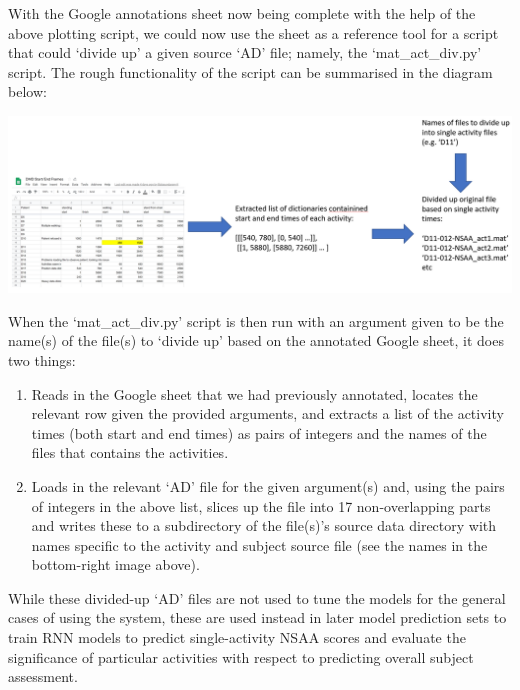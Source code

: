 \documentclass[12pt,twoside]{report}
\begin{document}
\quad With the Google annotations sheet now being complete with the help of the above plotting script, we could now use the sheet as a reference tool for a script that could ‘divide up’ a given source ‘AD’ file; namely, the ‘mat\_act\_div.py’ script. The rough functionality of the script can be summarised in the diagram below:

\begin{center}
\includegraphics[scale=0.23]{project_figures/fig8_11}
\end{center}

\quad When the ‘mat\_act\_div.py’ script is then run with an argument given to be the name(s) of the file(s) to ‘divide up’ based on the annotated Google sheet, it does two things:

\begin{enumerate}
	\item Reads in the Google sheet that we had previously annotated, locates the relevant row given the provided arguments, and extracts a list of the activity times (both start and end times) as pairs of integers and the names of the files that contains the activities.
	\item Loads in the relevant ‘AD’ file for the given argument(s) and, using the pairs of integers in the above list, slices up the file into 17 non-overlapping parts and writes these to a subdirectory of the file(s)’s source data directory with names specific to the activity and subject source file (see the names in the bottom-right image above).
\end{enumerate}

\quad While these divided-up ‘AD’ files are not used to tune the models for the general cases of using the system, these are used instead in later model prediction sets to train RNN models to predict single-activity NSAA scores and evaluate the significance of particular activities with respect to predicting overall subject assessment.






\end{document}
